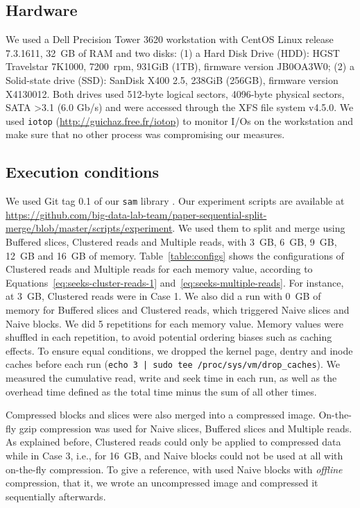 \documentclass[10pt, conference, compsocconf]{IEEEtran}
\newcommand{\todo}[1]{\marginpar{\parbox{18mm}{\flushleft\tiny\color{red}\textbf{TODO}:
      #1}}}
\begin{document}
\subsection{Hardware}
We used a Dell Precision Tower 3620 workstation with CentOS Linux
release 7.3.1611, 32~GB of RAM and two disks: (1) a Hard Disk Drive
(HDD): HGST Travelstar 7K1000, 7200~rpm, 931GiB (1TB), firmware
version JB0OA3W0; (2) a Solid-state drive (SSD): SanDisk X400 2.5,
238GiB (256GB), firmware version X4130012.  Both drives used 512-byte
logical sectors, 4096-byte physical sectors, SATA \textgreater 3.1 (6.0 Gb/s) and
were accessed through the XFS file system v4.5.0. We used
\texttt{iotop} (\url{http://guichaz.free.fr/iotop}) to monitor I/Os on
the workstation and make sure that no other process was compromising
our measures.

\subsection{Execution conditions}

We used Git tag 0.1 of our \texttt{sam} library \todo{tag it}. Our
experiment scripts are available at
\url{https://github.com/big-data-lab-team/paper-sequential-split-merge/blob/master/scripts/experiment}. We
used them to split and merge using Buffered slices, Clustered reads and
Multiple reads, with 3~GB, 6~GB, 9~GB, 12~GB and 16~GB of
memory. Table~\ref{table:configs} shows the configurations of Clustered
reads and Multiple reads for each memory value, according to
Equations~\ref{eq:seeks-cluster-reads-1}
and~\ref{eq:seeks-multiple-reads}. For instance, at 3~GB, Clustered reads were in
Case 1. We also did a run with 0~GB of memory for Buffered slices and
Clustered reads, which triggered Naive slices and Naive blocks. We did 5
repetitions for each memory value. Memory values were shuffled in each
repetition, to avoid potential ordering biases such
as caching effects. To ensure equal conditions, we dropped the kernel
page, dentry and inode caches before each run (\texttt{echo 3 | sudo
  tee /proc/sys/vm/drop\_caches}). We measured the cumulative read,
write and seek time in each run, as well as the overhead time defined
as the total time minus the sum of all other times.

Compressed blocks and slices were also merged into a compressed
image. On-the-fly gzip compression was used for Naive slices, Buffered
slices and Multiple reads. As explained before, Clustered reads could
only be applied to compressed data while in Case 3, i.e., for 16~GB,
and Naive blocks could not be used at all with on-the-fly
compression. To give a reference, with used Naive blocks with
\emph{offline} compression, that it, we wrote an uncompressed image
and compressed it sequentially afterwards. \todo{confirm that.}
\end{document}
